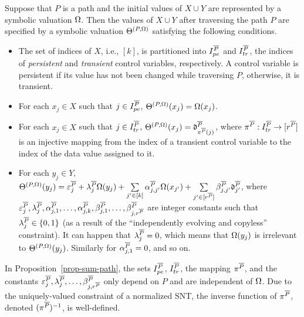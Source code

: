 \begin{proposition}\label{prop-sum-path}
Suppose that $P$ is a path and the initial values of $X \cup Y$ are represented by a symbolic valuation $\Omega$. Then the values of $X \cup Y$ after traversing the path $P$ are specified by a symbolic valuation $\Theta^{(P,\Omega)}$ satisfying the following conditions.
\begin{itemize}
\item The set of indices of $X$, i.e., $[k]$, is partitioned into $I^{\overline{P}}_{pe}$ and $I^{\overline{P}}_{tr}$, the indices of \emph{persistent} and \emph{transient} control variables, respectively. A control variable is persistent if its value has not been changed while traversing $P$, otherwise, it is transient.
\item For each $x_j\in X$ such that $j\in I^{\overline{P}}_{pe}$, $\Theta^{(P,\Omega)}(x_j)=\Omega(x_j)$.
%
\item  For each $x_j\in X$ such that $j\in I^{\overline{P}}_{tr}$,
$\Theta^{(P,\Omega)}(x_j)=\mathfrak{d}^{\overline{P}}_{\pi^{\overline{P}}(j)}$, where $\pi^{\overline{P}}: I^{\overline{P}}_{tr} \rightarrow [r^{\overline{P}}]$ is an injective mapping from the index of a transient control variable to the index of the data value assigned to it.
% 
\item For each $y_j \in Y$, 
$
 \Theta^{(P,\Omega)}(y_j)  =
 \varepsilon^{\overline{P}}_{j} + 
 \lambda^{\overline{P}}_j \Omega(y_j)  + 
  \sum\limits_{j'\in [k]}\alpha^{\overline{P}}_{j,j'}\Omega(x_{j'}) +
  \sum\limits_{j'\in [r^{\overline{P}}]}\beta^{\overline{P}}_{j,j'} \mathfrak{d}^{\overline{P}}_{j'}$,
where $\varepsilon^{\overline{P}}_j,\lambda^{\overline{P}}_j, \alpha^{\overline{P}}_{j,1},\dots,\alpha^{\overline{P}}_{j,k}, \beta^{\overline{P}}_{j,1},\dots,\beta^{\overline{P}}_{j,r^{\overline{P}}}$ are integer constants such that $\lambda^{\overline{P}}_{j} \in \{0,1\}$ (as a result of the ``independently evolving and copyless'' constraint).  It can happen that $\lambda^{\overline{P}}_j =0$,  which means that $\Omega(y_j)$ is irrelevant to $\Theta^{(P,\Omega)}(y_j)$. Similarly for $\alpha^{\overline{P}}_{j,1}=0$, and so on.
\end{itemize}
\end{proposition}
In Proposition~\ref{prop-sum-path}, the sets $I^{\overline{P}}_{pe}$, $I^{\overline{P}}_{tr}$, the mapping $\pi^{\overline{P}}$, and the constants $\varepsilon^{\overline{P}}_j,\lambda^{\overline{P}}_j, \dots, \beta^{\overline{P}}_{j,r^{\overline{P}}}$ only depend on $P$ and are independent of $\Omega$. Due to the uniquely-valued constraint of a normalized SNT, the inverse function of $\pi^{\overline{P}}$, denoted $(\pi^{\overline{P}})^{-1}$, is well-defined.


